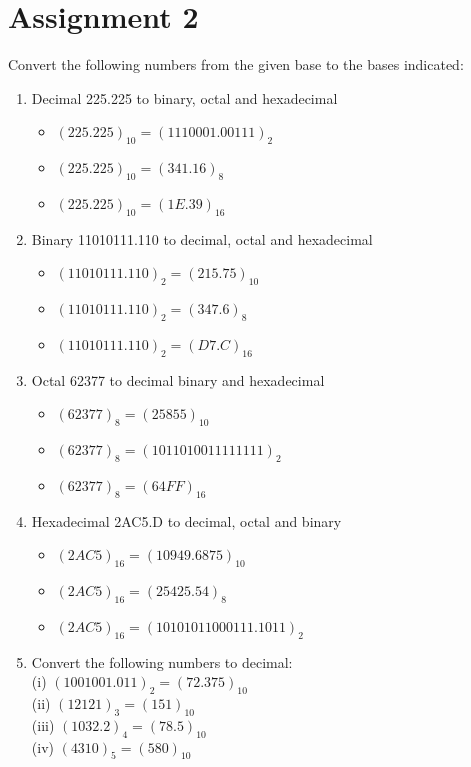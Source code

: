 \documentclass[12pt]{article}
\begin{document}
\section*{Assignment 2} Convert the following numbers from the given base to the bases indicated:
\begin{enumerate}
	\item Decimal 225.225 to binary, octal and hexadecimal
	\begin{itemize}
		\item $(225.225)_{10} = (1110001.00111)_2$
		\item $(225.225)_{10} = (341.16)_8$
		\item $(225.225)_{10} = (1E.39)_{16}$
	\end{itemize}
	\item Binary 11010111.110 to decimal, octal and hexadecimal
	\begin{itemize}
		\item $(11010111.110)_2 = (215.75)_{10}$
		\item $(11010111.110)_2 = (347.6)_8$
		\item $(11010111.110)_2 = (D7.C)_{16}$
	\end{itemize}
	\item Octal 62377 to decimal binary and hexadecimal
	\begin{itemize}
		\item $(62377)_8 = (25855)_{10}$
		\item $(62377)_8 = (1011010011111111)_2$
		\item $(62377)_8 = (64FF)_{16}$
	\end{itemize}
	\item Hexadecimal 2AC5.D to decimal, octal and binary
	\begin{itemize}
		\item $(2AC5)_{16} = (10949.6875)_{10}$
		\item $(2AC5)_{16} = (25425.54)_8$
		\item $(2AC5)_{16} = (10101011000111.1011)_2$
	\end{itemize}
	\item Convert the following numbers to decimal:\\
	(i) $(1001001.011)_2 = (72.375)_{10}$ \\
	(ii) $(12121)_3 = (151)_{10}$ \\
	(iii) $(1032.2)_4 = (78.5)_{10}$ \\
	(iv) $(4310)_5 = (580)_{10}$
\end{enumerate}
\end{document}
